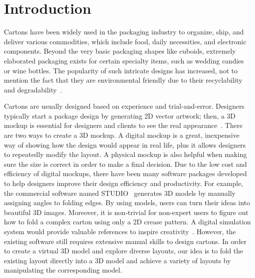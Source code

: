 \section{Introduction}

Cartons have been widely used in the packaging industry to organize, ship, and deliver various commodities, which include food, daily necessities, and electronic components. 
Beyond the very basic packaging shapes like cuboids, extremely elaborated packaging exists for certain specialty items, such as wedding candies or wine bottles. 
The popularity of such intricate designs has increased, not to mention the fact that they are environmental friendly due to their recyclability and degradability~\cite{Mullineux:2010:CSC:1739328.1739673}.

Cartons are usually designed based on experience and trial-and-error.
Designers typically start a package design by generating 2D vector artwork; then, a 3D mockup is essential for designers and clients to see the real appearance~\cite{guide}. There are two ways to create a 3D mockup.
A digital mockup is a great, inexpensive way of showing how the design would appear in real life, plus it allows designers to repeatedly modify the layout.
A physical mockup is also helpful when making sure the size is correct in order to make a final decision. 
%
Due to the low cost and efficiency of digital mockups, there have been many software packages developed to help designers improve their design efficiency and productivity.
%
For example, the commercial software named STUDIO~\cite{STUDIO} generates 3D models by manually assigning angles to folding edges. 
By using models, users can turn their ideas into beautiful 3D images.
Moreover, it is non-trivial for non-expert users to figure out how to fold a complex carton using only a 2D crease pattern. A digital simulation system would provide valuable references to inspire creativity~\cite{Thiel1998,Kishi:1998:OFP:786112.786279,Nimnual2007Virtual}. 
However, the existing software still requires extensive manual skills to design cartons.
In order to create a virtual 3D model and explore diverse layouts, our idea is to fold the existing layout directly into a 3D model and achieve a variety of layouts by manipulating the corresponding model.


